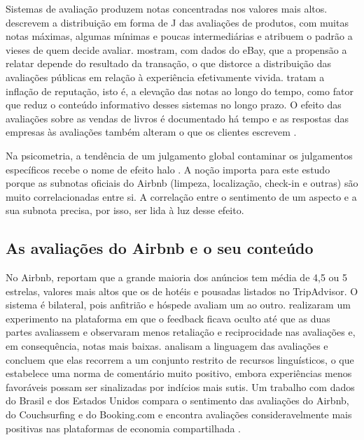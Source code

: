 Sistemas de avaliação produzem notas concentradas nos valores mais altos. \citet{hu2009} descrevem a distribuição em forma de J das avaliações de produtos, com muitas notas máximas, algumas mínimas e poucas intermediárias e atribuem o padrão a vieses de quem decide avaliar. \citet{dellarocas2008} mostram, com dados do eBay, que a propensão a relatar depende do resultado da transação, o que distorce a distribuição das avaliações públicas em relação à experiência efetivamente vivida. \citet{filippas2022} tratam a inflação de reputação, isto é, a elevação das notas ao longo do tempo, como fator que reduz o conteúdo informativo desses sistemas no longo prazo. O efeito das avaliações sobre as vendas de livros é documentado há tempo \citep{chevalier2006} e as respostas das empresas às avaliações também alteram o que os clientes escrevem \citep{proserpio2017}.

Na psicometria, a tendência de um julgamento global contaminar os julgamentos específicos recebe o nome de efeito halo \citep{thorndike1920}. A noção importa para este estudo porque as subnotas oficiais do Airbnb (limpeza, localização, check-in e outras) são muito correlacionadas entre si. A correlação entre o sentimento de um aspecto e a sua subnota precisa, por isso, ser lida à luz desse efeito.

\subsection{As avaliações do Airbnb e o seu conteúdo}

No Airbnb, \citet{zervas2021} reportam que a grande maioria dos anúncios tem média de 4,5 ou 5 estrelas, valores mais altos que os de hotéis e pousadas listados no TripAdvisor. O sistema é bilateral, pois anfitrião e hóspede avaliam um ao outro. \citet{fradkin2021} realizaram um experimento na plataforma em que o feedback ficava oculto até que as duas partes avaliassem e observaram menos retaliação e reciprocidade nas avaliações e, em consequência, notas mais baixas. \citet{bridges2016} analisam a linguagem das avaliações e concluem que elas recorrem a um conjunto restrito de recursos linguísticos, o que estabelece uma norma de comentário muito positivo, embora experiências menos favoráveis possam ser sinalizadas por indícios mais sutis. Um trabalho com dados do Brasil e dos Estados Unidos compara o sentimento das avaliações do Airbnb, do Couchsurfing e do Booking.com e encontra avaliações consideravelmente mais positivas nas plataformas de economia compartilhada \citep{santos2020}.

